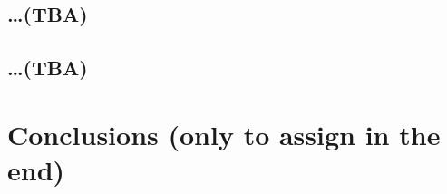 \begin{bibunit}
        \subsection{\ldots (TBA)}

        \subsection{\ldots (TBA)}


        \section{Conclusions (only to assign in the end)}\label{sec:2}

	
	
	
	
	


\end{bibunit}
